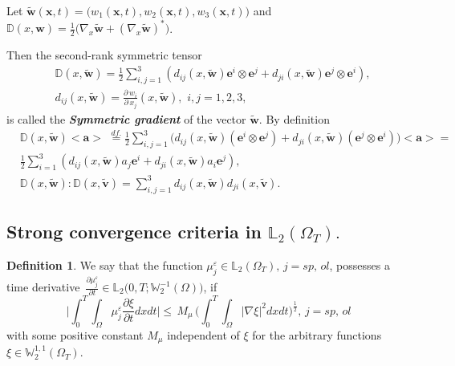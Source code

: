 \documentclass{article}
\theoremstyle{plain}
\theoremstyle{definition}
\newtheorem{definition}[theorem]{Definition}
\numberwithin{equation}{section}
\begin{document}
Let $\widetilde{\boldsymbol{w}}(\boldsymbol{x},t)=
\big({w}_{1}(\boldsymbol{x},t),{w}_{2}(\boldsymbol{x},t),{w}_{3}(\boldsymbol{x},t)\big)$ and
$\mathbb{D}(x,\boldsymbol{w})=
\frac{1}{2}\big(\nabla_{x}\widetilde{\boldsymbol{w}}+(\nabla_{x}\widetilde{\boldsymbol{w}})^{*}\big)$.

Then the second-rank symmetric tensor
\begin{equation}\label{eq2.3}
\begin{aligned}
&
\mathbb{D}(x,\widetilde{\boldsymbol{w}})=\frac{1}{2}\sum_{i,j=1}^{3}({d}_{ij}(x,\widetilde{\boldsymbol{w}})
\boldsymbol{e}^{i}\otimes\boldsymbol{e}^{j}+
{d}_{ji}(x,\widetilde{\boldsymbol{w}})\boldsymbol{e}^{j}\otimes\boldsymbol{e}^{i}),
\\
& {d}_{ij}(x,\widetilde{\boldsymbol{w}})=
\frac{\partial\,w_{i}}{\partial\,x_{j}}(x,\widetilde{\boldsymbol{w}}),\,\,i,j=1,2,3,
\end{aligned}
\end{equation}
is called the \textbf{\emph{Symmetric gradient}} of the vector $\widetilde{\boldsymbol{w}}$.
By definition
\begin{equation}\label{eq2.4}
\begin{aligned}
&
\mathbb{D}(x,\widetilde{\boldsymbol{w}})<\boldsymbol{a}>\,\,\stackrel{df.}{=}\frac{1}{2}\sum_{i,j=1}^{3}
\big({d}_{ij}(x,\widetilde{\boldsymbol{w}})(\boldsymbol{e}^{i}\otimes
\boldsymbol{e}^{j})+{d}_{ji}(x,\widetilde{\boldsymbol{w}})
(\boldsymbol{e}^{j}\otimes\boldsymbol{e}^{i})\big)<\boldsymbol{a}>=
\\
& \frac{1}{2}\sum_{i=1}^{3}({d}_{ij}(x,\widetilde{\boldsymbol{w}}){a}_{j}\boldsymbol{e}^{i}+
{d}_{ji}(x,\widetilde{\boldsymbol{w}}){a}_{i}\boldsymbol{e}^{j}),
\\
& \mathbb{D}(x,\widetilde{\boldsymbol{w}}):\mathbb{D}(x,\widetilde{\boldsymbol{v}})=
\sum_{i,j=1}^{3}{d}_{ij}(x,\widetilde{\boldsymbol{w}}){d}_{ji}(x,\widetilde{\boldsymbol{v}}).
\end{aligned}
\end{equation}

\subsection{Strong convergence criteria in $\mathbb{L}_{2}(\Omega_{T}).$}

\begin{definition}\label{de1}
We say that the function ${\mu^{\varepsilon}_{j}}\in\mathbb{L}_{2}(\Omega_{T}),\,j=sp,\,ol$,
possesses a time derivative
$\displaystyle\,\frac{\partial\mu^{\varepsilon}_{j}}{\partial{t}}\in\mathbb{L}_{2}\big(0,T;
\mathbb{W}^{-1}_{2}(\Omega)\big)$, if
\begin{equation*}
\Big|\int_{0}^{T}\int_{\Omega}\mu^{\varepsilon}_{j}\frac{\partial \xi}{\partial t}dxdt\Big|\leqslant \,M_{\mu}\,\Big(\int_{0}^{T}\int_{\Omega}|\nabla\xi|^{2}dxdt\Big)^{\frac{1}{2}},\,j=sp,\,ol
\end{equation*}
with some positive constant $M_{\mu}$ independent of $\xi$ for the arbitrary functions $\xi\in\mathbb{W}^{1,1}_{2}(\Omega_{T})$.
\end{definition}
\end{document}
